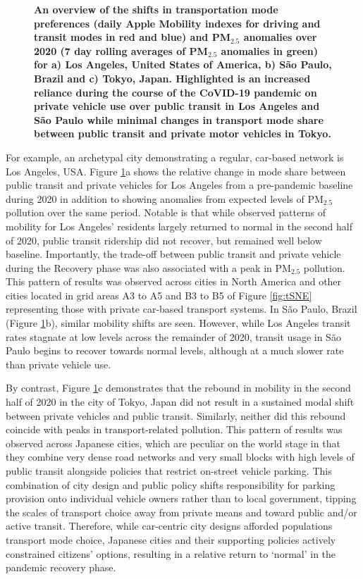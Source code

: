 \documentclass[preprint,12pt]{elsarticle}
\begin{document}
\begin{figure}
         \label{fig:Tokyo}
        \caption{\bf An overview of the shifts in transportation mode preferences (daily Apple Mobility indexes for driving and transit modes in red and blue) and PM$_{2.5}$ anomalies over 2020 (7 day rolling averages of PM$_{2.5}$ anomalies in green) for a) Los Angeles, United States of America, b) S\~ao Paulo, Brazil and c) Tokyo, Japan. Highlighted is an increased reliance during the course of the CoVID-19 pandemic on private vehicle use over public transit in Los Angeles and S\~ao Paulo while minimal changes in transport mode share between public transit and private motor vehicles in Tokyo.}
        \label{fig:three_graphs_Driv_trans}
\end{figure}

For example, an archetypal city demonstrating a regular, car-based network is Los Angeles, USA. Figure \ref{fig:three_graphs_Driv_trans}a shows the relative change in mode share between public transit and private vehicles for Los Angeles from a pre-pandemic baseline during 2020 in addition to showing anomalies from expected levels of PM$_{2.5}$ pollution over the same period. Notable is that while observed patterns of mobility for Los Angeles' residents largely returned to normal in the second half of 2020, public transit ridership did not recover, but remained well below baseline. Importantly, the trade-off between public transit and private vehicle during the Recovery phase was also associated with a peak in PM$_{2.5}$ pollution. This pattern of results was observed across cities in North America and other cities located in grid areas A3 to A5 and B3 to B5 of Figure \ref{fig:tSNE} representing those with private car-based transport systems. In S\~ao Paulo, Brazil (Figure \ref{fig:three_graphs_Driv_trans}b), similar mobility shifts are seen. However, while Los Angeles transit rates stagnate at low levels across the remainder of 2020, transit usage in S\~ao Paulo begins to recover towards normal levels, although at a much slower rate than private vehicle use.

By contrast, Figure \ref{fig:three_graphs_Driv_trans}c demonstrates that the rebound in mobility in the second half of 2020 in the city of Tokyo, Japan did not result in a sustained modal shift between private vehicles and public transit. Similarly, neither did this rebound coincide with peaks in transport-related pollution. This pattern of results was observed across Japanese cities, which are peculiar on the world stage in that they combine very dense road networks and very small blocks with high levels of public transit alongside policies that restrict on-street vehicle parking\cite{clements2019socialising}. This combination of city design and public policy shifts responsibility for parking provision onto individual vehicle owners rather than to local government, tipping the scales of transport choice away from private means and toward public and/or active transit. Therefore, while car-centric city designs afforded populations transport mode choice, Japanese cities and their supporting policies actively constrained citizens' options, resulting in a relative return to `normal' in the pandemic recovery phase.
\end{document}
